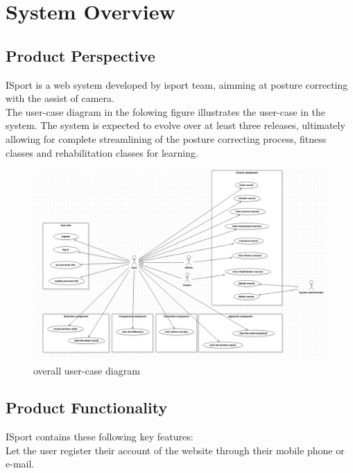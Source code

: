 \documentclass[16pt]{scrreprt}
\begin{document}

\chapter{System Overview}
\section{Product Perspective}

ISport is a web system developed by isport team, aimming at posture correcting with the assist of camera.\\

The user-case diagram in the folowing figure illustrates the user-case in the system. The system is expected to evolve over at least three releases, ultimately allowing for complete streamlining of the posture correcting process, fitness classes and rehabilitation classes for learning.

\begin{figure}[H]
	\centering
	\includegraphics[width=1.0\textwidth]{diagrams/big-user-case.png}
	\caption{overall user-case diagram}
\end{figure}



\section{Product Functionality}

ISport contains these following key features:\\

Let the user register their account of the website through their mobile phone or e-mail.\\
\end{document}
